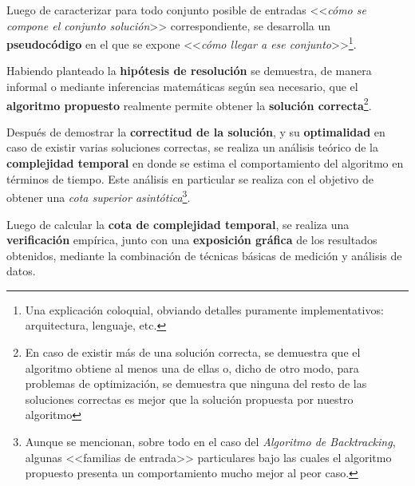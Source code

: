 \documentclass[11pt, a4paper, twoside]{article}
\begin{document}
Luego de caracterizar para todo conjunto posible de entradas <<\textit{cómo se compone el conjunto solución}>> correspondiente, se desarrolla un \textbf{pseudocódigo} en el que se expone <<\textit{cómo llegar a ese conjunto}>>\footnote{Una explicación coloquial, obviando detalles puramente implementativos: arquitectura, lenguaje, etc.}.

Habiendo planteado la \textbf{hipótesis de resolución} se demuestra, de manera informal o mediante inferencias matemáticas según sea necesario, que el \textbf{algoritmo propuesto} realmente permite obtener la \textbf{solución correcta}\footnote{En caso de existir más de una solución correcta, se demuestra que el algoritmo obtiene al menos una de ellas o, dicho de otro modo, para problemas de optimización, se demuestra que ninguna del resto de las soluciones correctas es mejor que la solución propuesta por nuestro algoritmo}.

Después de demostrar la \textbf{correctitud de la solución}, y su \textbf{optimalidad} en caso de existir varias soluciones correctas, se realiza un análisis teórico de la \textbf{complejidad temporal} en donde se estima el comportamiento del algoritmo en términos de tiempo. Este análisis en particular se realiza con el objetivo de obtener una \textit{cota superior asintótica}\footnote{Aunque se mencionan, sobre todo en el caso del \textit{Algoritmo de Backtracking}, algunas <<familias de entrada>> particulares bajo las cuales el algoritmo propuesto presenta un comportamiento mucho mejor al peor caso.}.

Luego de calcular la \textbf{cota de complejidad temporal}, se realiza una \textbf{verificación} empírica, junto con una \textbf{exposición gráfica} de los resultados obtenidos, mediante la combinación de técnicas básicas de medición y análisis de datos.


\end{document}
